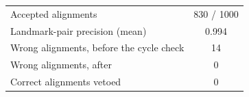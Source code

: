 \begin{tabular}{lc}
\toprule
Accepted alignments & 830 / 1000 \\
Landmark-pair precision (mean) & 0.994 \\
Wrong alignments, before the cycle check & 14 \\
Wrong alignments, after & 0 \\
Correct alignments vetoed & 0 \\
\bottomrule
\end{tabular}
